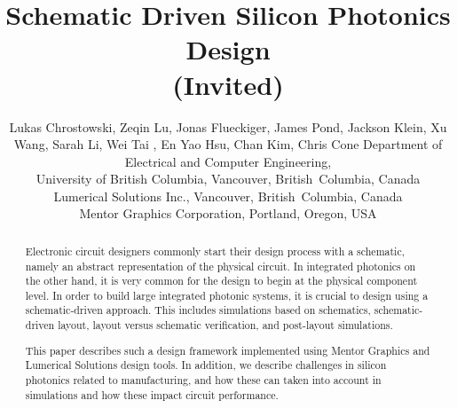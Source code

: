 \documentclass[journal]{spie}
\begin{document}
\title{Schematic Driven Silicon Photonics Design \\
(Invited)}

\author{Lukas Chrostowski, 
Zeqin Lu, 
Jonas Flueckiger,
James Pond, 
Jackson Klein,
Xu Wang,
Sarah Li, 
Wei Tai , 
En Yao Hsu, 
Chan Kim, 
Chris Cone
\skiplinehalf
{}Department of Electrical and Computer Engineering, \\
University of British Columbia, Vancouver, British~Columbia, Canada \\
Lumerical Solutions Inc.,  Vancouver, British~Columbia, Canada \\
Mentor Graphics Corporation, Portland, Oregon, USA
}

\maketitle

\begin{abstract}

Electronic circuit designers commonly start their design process with a schematic, namely an abstract representation of the physical circuit.  In integrated photonics on the other hand, it is very common for the design to begin at the physical component level.  In order to build large integrated photonic systems, it is crucial to design using a schematic-driven approach.  This includes simulations based on schematics, schematic-driven layout, layout versus schematic verification, and post-layout simulations.  

This paper  describes such a design framework implemented using Mentor Graphics and Lumerical Solutions design tools.  In addition, we describe challenges in silicon photonics related to manufacturing, and how these can taken into account in simulations and how these impact circuit performance.



\end{abstract}
\end{document}
